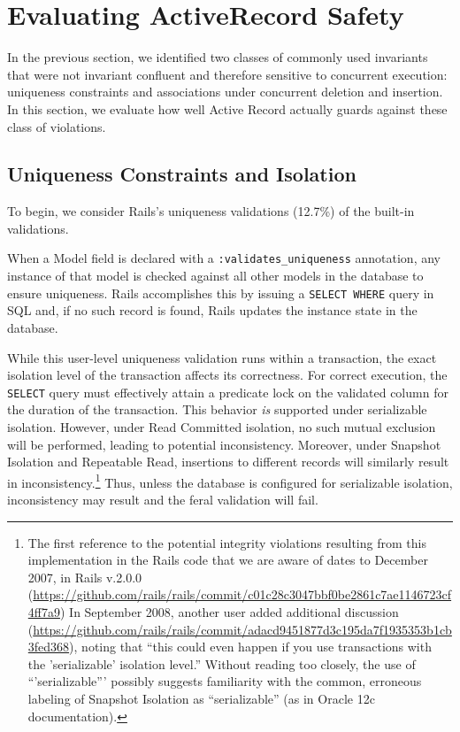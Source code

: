
\section{Evaluating ActiveRecord Safety}
\label{sec:evaluation}

In the previous section, we identified two classes of commonly used
invariants that were not invariant confluent and therefore sensitive
to concurrent execution: uniqueness constraints and associations under
concurrent deletion and insertion. In this section, we evaluate
how well Active Record actually guards against these class of
violations. 

\subsection{Uniqueness Constraints and Isolation}

To begin, we consider Rails's uniqueness validations (12.7\%) of the
built-in validations.

When a Model field is declared with a \texttt{:validates\_uniqueness}
annotation, any instance of that model is checked against all other
models in the database to ensure uniqueness. Rails accomplishes this
by issuing a \texttt{SELECT WHERE} query in SQL and, if no such record
is found, Rails updates the instance state in the database.

While this user-level uniqueness validation runs within a transaction,
the exact isolation level of the transaction affects its
correctness. For correct execution, the \texttt{SELECT} query must
effectively attain a predicate lock on the validated column for the
duration of the transaction. This behavior \textit{is} supported under
serializable isolation. However, under Read Committed isolation, no
such mutual exclusion will be performed, leading to potential
inconsistency. Moreover, under Snapshot Isolation and Repeatable Read,
insertions to different records will similarly result in
inconsistency.\footnote{The first reference to the potential integrity
  violations resulting from this implementation in the Rails code that
  we are aware of dates to December 2007, in Rails v.2.0.0
  (\url{https://github.com/rails/rails/commit/c01c28c3047bbf0be2861c7ae1146723cf4ff7a9})
  In September 2008, another user added additional discussion
  (\url{https://github.com/rails/rails/commit/adacd9451877d3c195da7f1935353b1cb3fed368}),
  noting that ``this could even happen if you use transactions with
  the 'serializable' isolation level.'' Without reading too closely,
  the use of ``'serializable''' possibly suggests familiarity with the
  common, erroneous labeling of Snapshot Isolation as ``serializable''
  (as in Oracle 12c documentation)\label{fn:si-rails}. } Thus, unless the database is
configured for serializable isolation, inconsistency may result and
the feral validation will fail.

